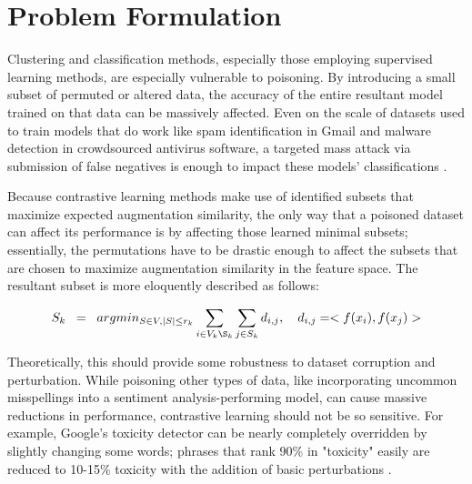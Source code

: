 \section{Problem Formulation}

\begin{comment}
\begin{enumerate}
    \item Clearly define the problem or question your research aims to address.
    \item Try to be formal here (use mathematical notation as far as possible)
    \item Clearly state the specific setting you are exploring rather than the overarching problem
\end{enumerate}
\end{comment}

Clustering and classification methods, especially those employing supervised learning methods, are especially vulnerable to poisoning. By introducing a small subset of permuted or altered data, the accuracy of the entire resultant model trained on that data can be massively affected. Even on the scale of datasets used to train models that do work like spam identification in Gmail and malware detection in crowdsourced antivirus software, a targeted mass attack via submission of false negatives is enough to impact these models' classifications \cite{constantin2021data}.

Because contrastive learning methods make use of identified subsets that maximize expected augmentation similarity, the only way that a poisoned dataset can affect its performance is by affecting those learned minimal subsets; essentially, the permutations have to be drastic enough to affect the subsets that are chosen to maximize augmentation similarity in the feature space. The resultant subset is more eloquently described as follows:

$$S_k\;\; =\;\; arg min_{S \in V,|S| \leq r_k}\sum_{i\in V_k\S_k}\sum_{j\in S_k} d_{i,j},\quad d_{i,j} = <f(x_i), f(x_j)> $$

Theoretically, this should provide some robustness to dataset corruption and perturbation. While poisoning other types of data, like incorporating uncommon misspellings into a sentiment analysis-performing model, can cause massive reductions in performance, contrastive learning should not be so sensitive. For example, Google's toxicity detector can be nearly completely overridden by slightly changing some words; phrases that rank 90\% in "toxicity" easily are reduced to 10-15\% toxicity with the addition of basic perturbations \cite{hosseini2017}.

